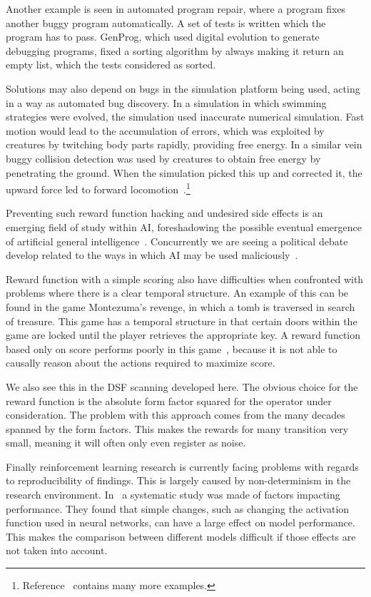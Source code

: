 \documentclass[11pt, a4paper]{report} %
\begin{document}
Another example is seen in automated program repair, where a program fixes another buggy program automatically.
A set of tests is written which the program has to pass.
GenProg, which used digital evolution to generate debugging programs, fixed a sorting algorithm by always making it return an empty list, which the tests considered as sorted.

Solutions may also depend on bugs in the simulation platform being used, acting in a way as automated bug discovery.
In a simulation in which swimming strategies were evolved, the simulation used inaccurate numerical simulation.
Fast motion would lead to the accumulation of errors, which was exploited by creatures by twitching body parts rapidly, providing free energy.
In a similar vein buggy collision detection was used by creatures to obtain free energy by penetrating the ground.
When the simulation picked this up and corrected it, the upward force led to forward locomotion~\cite{1803.03453}.\footnote{Reference~\cite{1803.03453} contains many more examples.} 

Preventing such reward function hacking and undesired side effects is an emerging field of study within AI, foreshadowing the possible eventual emergence of artificial general intelligence~\cite{amodei16_concr_probl_ai_safet}.
Concurrently we are seeing a political debate develop related to the ways in which AI may be used maliciously~\cite{brundage18_malic_use_artif_intel}.

Reward function with a simple scoring also have difficulties when confronted with problems where there is a clear temporal structure.
An example of this can be found in the game Montezuma's revenge, in which a tomb is traversed in search of treasure.
This game has a temporal structure in that certain doors within the game are locked until the player retrieves the appropriate key.
A reward function based only on score performs poorly in this game~\cite{mnih15_human_level_contr_throug_deep_reinf_learn}, because it is not able to causally reason about the actions required to maximize score.

We also see this in the DSF scanning developed here.
The obvious choice for the reward function is the absolute form factor squared for the operator under consideration.
The problem with this approach comes from the many decades spanned by the form factors.
This makes the rewards for many transition very small, meaning it will often only even register as noise.

Finally reinforcement learning research is currently facing problems with regards to reproducibility of findings.
This is largely caused by non-determinism in the research environment.
In~\cite{1709.06560} a systematic study was made of factors impacting performance.
They found that simple changes, such as changing the activation function used in neural networks, can have a large effect on model performance.
This makes the comparison between different models difficult if those effects are not taken into account.
\end{document}
